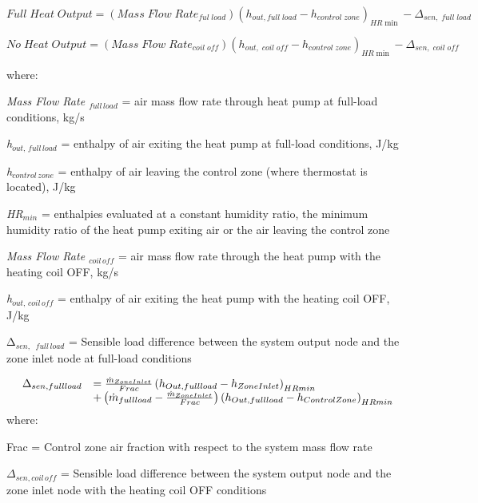 \begin{equation}
Full\;Heat\;Output = (Mass\;Flow\;Rat{e_{ful\;load}}){({h_{out,full\;load}} - {h_{control\;zone}})_{HR\min }} - {\Delta_{sen,\;full\;load}}
\end{equation}

\begin{equation}
No\;Heat\;Output = (Mass\;Flow\;Rat{e_{coil\;off}}){({h_{out,\;coil\;off}} - {h_{control\;zone}})_{HR\min }} - {\Delta_{sen,\;coil\;off}}
\end{equation}

where:

\emph{Mass Flow Rate \(_{full\, load}\)} = air mass flow rate through heat pump at full-load conditions, kg/s

\emph{h\(_{out,\, full\, load}\)} = enthalpy of air exiting the heat pump at full-load conditions, J/kg

\emph{h\(_{control \, zone}\)} = enthalpy of air leaving the control zone (where thermostat is located), J/kg

\emph{HR\(_{min}\)} = enthalpies evaluated at a constant humidity ratio, the minimum humidity ratio of the heat pump exiting air or the air leaving the control zone

\emph{Mass Flow Rate \(_{coil \, off}\)} = air mass flow rate through the heat pump with the heating coil OFF, kg/s

\emph{h\(_{out,\, coil \, off}\)} = enthalpy of air exiting the heat pump with the heating coil OFF, J/kg

Δ\(_{sen,}\) \emph{\(_{full\, load}\)} = Sensible load difference between the system output node and the zone inlet node at full-load conditions

\begin{equation}
  \begin{array}{rl}
    \Delta_{sen,full load} &= \frac{\dot{m}_{ZoneInlet}}{Frac} \left(h_{Out,full load} - h_{ZoneInlet}\right)_{HRmin} \\
                           &+ \left(\dot{m}_{full load} - \frac{\dot{m}_{ZoneInlet}}{Frac}\right) \left(h_{Out,full load} - h_{ControlZone}\right)_{HRmin}
  \end{array}
\end{equation}
where:

Frac = Control zone air fraction with respect to the system mass flow rate

\(\Delta_{sen,coil\, off}\) = Sensible load difference between the system output node and the zone inlet node with the heating coil OFF conditions

